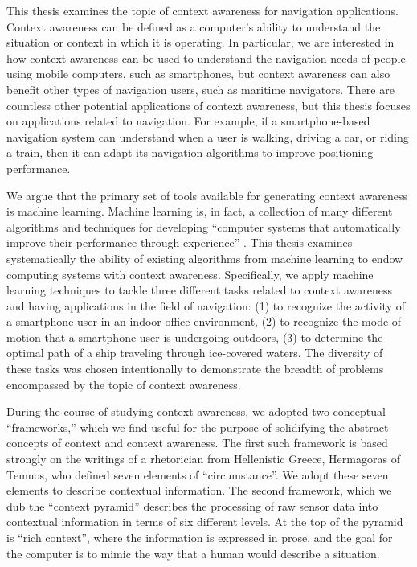 This thesis examines the topic of context awareness for navigation applications. Context awareness can be defined as a computer's ability to understand the situation or context in which it is operating. In particular, we are interested in how context awareness can be used to understand the navigation needs of people using mobile computers, such as smartphones, but context awareness can also benefit other types of navigation users, such as maritime navigators. There are countless other potential applications of context awareness, but this thesis focuses on applications related to navigation. For example, if a smartphone-based navigation system can understand when a user is walking, driving a car, or riding a train, then it can adapt its navigation algorithms to improve positioning performance.

We argue that the primary set of tools available for generating context awareness is machine learning. Machine learning is, in fact, a collection of many different algorithms and techniques for developing ``computer systems that automatically improve their performance through experience'' \cite{Mitchell1990}. This thesis examines systematically the ability of existing algorithms from machine learning to endow computing systems with context awareness. Specifically, we apply machine learning techniques to tackle three different tasks related to context awareness and having applications in the field of navigation:  (1) to recognize the activity of a smartphone user in an indoor office environment, (2) to recognize the mode of motion that a smartphone user is undergoing outdoors, (3) to determine the optimal path of a ship traveling through ice-covered waters. The diversity of these tasks was chosen intentionally to demonstrate the breadth of problems encompassed by the topic of context awareness.

During the course of studying context awareness, we adopted two conceptual ``frameworks,'' which we find useful for the purpose of solidifying the abstract concepts of context and context awareness. The first such framework is based strongly on the writings of a rhetorician from Hellenistic Greece, Hermagoras of Temnos, who defined seven elements of ``circumstance''. We adopt these seven elements to describe contextual information. The second framework, which we dub the ``context pyramid'' describes the processing of raw sensor data into contextual information in terms of six different levels. At the top of the pyramid is ``rich context'', where the information is expressed in prose, and the goal for the computer is to mimic the way that a human would describe a situation.

